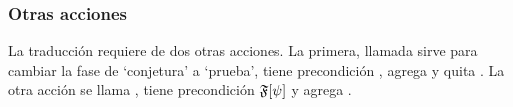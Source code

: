 \subsubsection{Otras acciones}
La traducción requiere de dos otras acciones. La primera,
llamada  sirve para cambiar la fase de
`conjetura' a `prueba', tiene precondición , agrega
 y quita . La otra acción se llama
, tiene precondición $\mathfrak{F}[\psi]$ y agrega 
.


%
%
%
%
%
%
%
%
%

